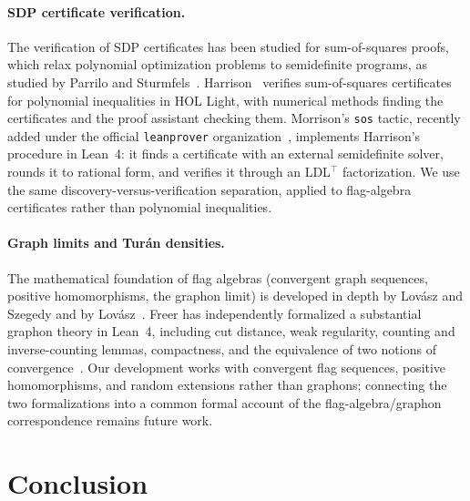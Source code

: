 \documentclass{article}
\newcommand{\lean}[1]{\texttt{#1}}
\begin{document}
\paragraph{SDP certificate verification.}
The verification of SDP certificates has been studied for sum-of-squares
proofs, which relax polynomial optimization problems to semidefinite
programs, as studied by Parrilo and
Sturmfels~\cite{parrilo2003minimizing}.  Harrison~\cite{harrison2007verifying}
verifies sum-of-squares certificates for polynomial inequalities in HOL
Light, with numerical methods finding the certificates and the proof
assistant checking them.  Morrison's \lean{sos} tactic, recently added
under the official \lean{leanprover} organization~\cite{morrison2026sos},
implements Harrison's procedure in Lean~4: it finds a certificate with an
external semidefinite solver, rounds it to rational form, and verifies it
through an LDL$^\top$ factorization.  We use the same
discovery-versus-verification separation, applied to flag-algebra
certificates rather than polynomial inequalities.

\paragraph{Graph limits and Turán densities.}
The mathematical foundation of flag algebras (convergent graph sequences,
positive homomorphisms, the graphon limit) is developed in depth by
Lov\'asz and Szegedy and by Lov\'asz~\cite{lovasz2006limits,lovasz2012large}.
Freer has independently formalized a
substantial graphon theory in Lean~4, including cut distance, weak
regularity,
counting and inverse-counting lemmas, compactness, and the equivalence of two
notions of convergence~\cite{freer2026graphon}.  Our development works with
convergent flag sequences, positive homomorphisms, and random extensions
rather than graphons; connecting the two formalizations into a common formal
account of the flag-algebra/graphon correspondence remains future work.


\section{Conclusion}
\label{sec:conclusion}
\end{document}
